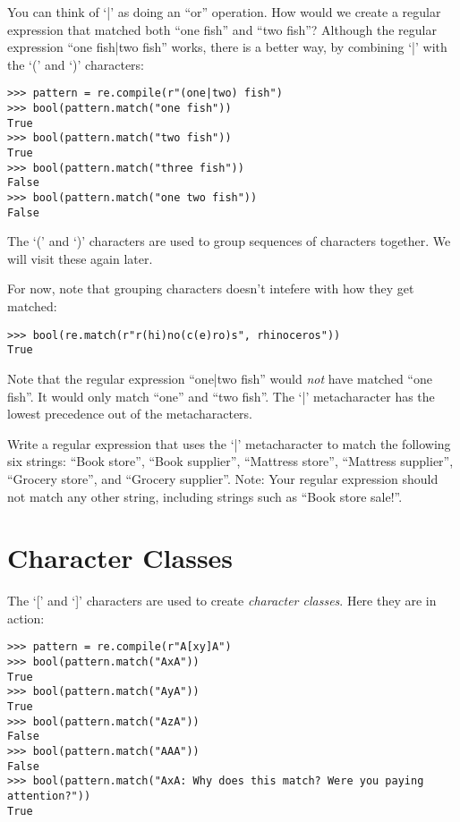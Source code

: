 You can think of `|' as doing an ``or'' operation.
How would we create a regular expression that matched both ``one fish'' and ``two fish''?
Although the regular expression ``one fish|two fish'' works, there is a better way, by combining `|' with the `(' and `)' characters:
\begin{lstlisting}
>>> pattern = re.compile(r"(one|two) fish")
>>> bool(pattern.match("one fish"))
True
>>> bool(pattern.match("two fish"))
True
>>> bool(pattern.match("three fish"))
False
>>> bool(pattern.match("one two fish"))
False
\end{lstlisting}

The `(' and `)' characters are used to group sequences of characters together.
We will visit these again later.

For now, note that grouping characters doesn't intefere with how they get matched:
\begin{lstlisting}
>>> bool(re.match(r"r(hi)no(c(e)ro)s", rhinoceros"))
True
\end{lstlisting}

Note that the regular expression ``one|two fish'' would \emph{not} have matched ``one fish''. It would only match ``one'' and ``two fish''. The `|' metacharacter has the lowest precedence out of the metacharacters.


\begin{problem}
Write a regular expression that uses the `|' metacharacter to match the following six strings: %
    ``Book store'',
    ``Book supplier'',
    ``Mattress store'',
    ``Mattress supplier'',
    ``Grocery store'', and
    ``Grocery supplier''.
Note: Your regular expression should not match any other string, including strings such as ``Book store sale!''.
\end{problem}

\section*{Character Classes}
The `[' and `]' characters are used to create \emph{character classes}.
Here they are in action:
\begin{lstlisting}
>>> pattern = re.compile(r"A[xy]A")
>>> bool(pattern.match("AxA"))
True
>>> bool(pattern.match("AyA"))
True
>>> bool(pattern.match("AzA"))
False
>>> bool(pattern.match("AAA"))
False
>>> bool(pattern.match("AxA: Why does this match? Were you paying attention?"))
True
\end{lstlisting}

